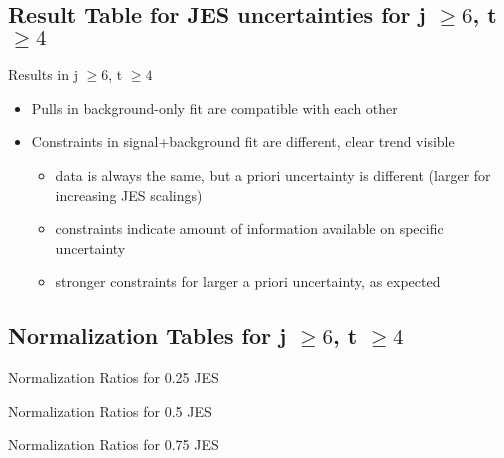 \subsection{Result Table for JES uncertainties for j $\geq 6$, t $\geq 4$}
\begin{frame}{Results in j $\geq 6$, t $\geq 4$}

\begin{itemize}
\item Pulls in background-only fit are compatible with each other
\item Constraints in signal+background fit are different, clear trend visible\\
\begin{itemize}
\item data is always the same, but a priori uncertainty is different (larger for increasing JES scalings)\\
\item constraints indicate amount of information available on specific uncertainty\\
\item stronger constraints for larger a priori uncertainty, as expected
\end{itemize}
\end{itemize}
\end{frame}

\subsection{Normalization Tables for j $\geq 6$, t $\geq 4$}

\begin{frame}{Normalization Ratios for \num[round-precision=2]{0.25} JES}
\begin{scriptsize}

\end{scriptsize}
\end{frame}

\begin{frame}{Normalization Ratios for \num[round-precision=2]{0.5} JES}
\begin{scriptsize}

\end{scriptsize}
\end{frame}

\begin{frame}{Normalization Ratios for \num[round-precision=2]{0.75} JES}
\begin{scriptsize}

\end{scriptsize}
\end{frame}

